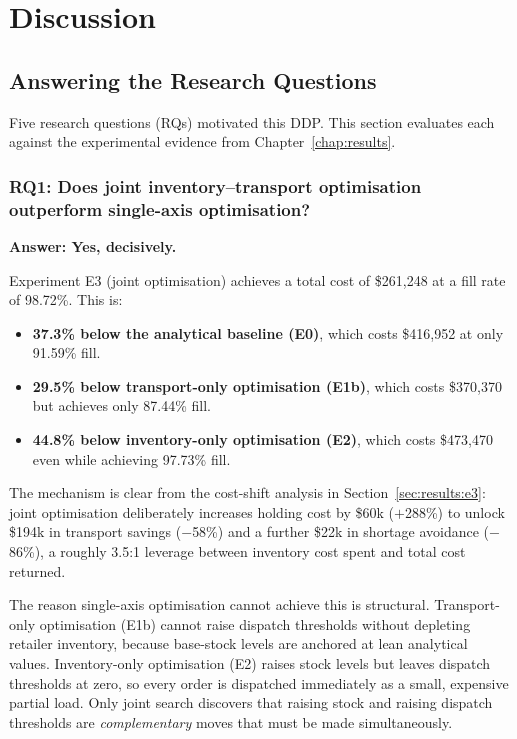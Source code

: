 \chapter{Discussion}
\label{chap:discussion}

\section{Answering the Research Questions}
\label{sec:disc:rq}

Five research questions (RQs) motivated this DDP.  This section
evaluates each against the experimental evidence from
Chapter~\ref{chap:results}.

\subsection{RQ1: Does joint inventory--transport optimisation outperform
single-axis optimisation?}

\textbf{Answer: Yes, decisively.}

Experiment E3 (joint optimisation) achieves a total cost of \$261,248
at a fill rate of 98.72\%.  This is:
\begin{itemize}
  \item \textbf{37.3\% below the analytical baseline (E0)}, which costs
        \$416,952 at only 91.59\% fill.
  \item \textbf{29.5\% below transport-only optimisation (E1b)}, which
        costs \$370,370 but achieves only 87.44\% fill.
  \item \textbf{44.8\% below inventory-only optimisation (E2)}, which
        costs \$473,470 even while achieving 97.73\% fill.
\end{itemize}

The mechanism is clear from the cost-shift analysis in
Section~\ref{sec:results:e3}: joint optimisation deliberately increases
holding cost by \$60k ($+$288\%) to unlock \$194k in transport savings
($-$58\%) and a further \$22k in shortage avoidance ($-$86\%), a
roughly 3.5:1 leverage between inventory cost spent and total cost
returned.

The reason single-axis optimisation cannot achieve this is structural.
Transport-only optimisation (E1b) cannot raise dispatch thresholds
without depleting retailer inventory, because base-stock levels are
anchored at lean analytical values.  Inventory-only optimisation (E2)
raises stock levels but leaves dispatch thresholds at zero, so every
order is dispatched immediately as a small, expensive partial load.
Only joint search discovers that raising stock and raising dispatch
thresholds are \emph{complementary} moves that must be made
simultaneously.


